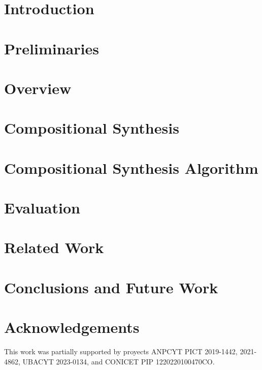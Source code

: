 \documentclass[runningheads,anonymous]{llncs}
\begin{document}
\section{Introduction}


\section{Preliminaries}


\section{Overview}\label{section:overview}


\section{Compositional Synthesis}


\section{Compositional Synthesis Algorithm}\label{section:algorithm}


\section{Evaluation}

\section{Related Work}


\section{Conclusions and Future Work}


%
%
%
\section*{Acknowledgements}
This work was partially supported by proyects ANPCYT PICT 2019-1442, 2021-4862, UBACYT 2023-0134, and CONICET PIP 1220220100470CO.




\end{document}
